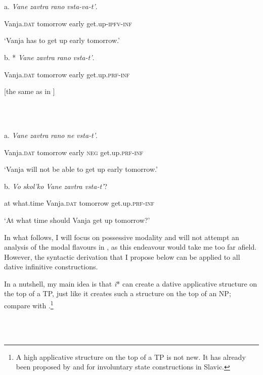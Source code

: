 \documentclass[output=paper,modfonts,nonflat]{langsci/langscibook}
\begin{document}
\ea%
    \label{ex:key:29}
    \gll\\
        \\
    \glt
    \z

          a.   \textit{Vane}\textbf{ }          \textit{zavtra}       \textit{rano}   \textit{vsta-va-t’}.

    Vanja.\textsc{dat}  tomorrow  early  get.up-\textsc{ipfv-inf}

  ‘Vanja has to get up early tomorrow.’  

  b.   *  \textit{Vane}\textbf{ }          \textit{zavtra}       \textit{rano}   \textit{vsta-t’}.

    Vanja.\textsc{dat}  tomorrow  early  get.up.\textsc{prf-inf}

  [the same as in ] 

\ea%
    \label{ex:key:30}
    \gll\\
        \\
    \glt
    \z

          a.  \textit{Vane}\textbf{ }          \textit{zavtra}       \textit{rano}   \textit{ne}     \textit{vsta-t’}.

    Vanja.\textsc{dat}  tomorrow  early  \textsc{neg}    get.up.\textsc{prf-inf}

  ‘Vanja will not be able to get up early tomorrow.’ 

  b.    \textit{Vo}    \textit{skol’ko}       \textit{Vane}           \textit{zavtra}         \textit{vsta-t’}?

    at    what.time    Vanja.\textsc{dat}  tomorrow    get.up.\textsc{prf-inf}

  ‘At what time should Vanja get up tomorrow?’ 

In what follows, I will focus on possessive modality and will not attempt an analysis of the modal flavours in , as this endeavour would take me too far afield. However, the syntactic derivation that I propose below can be applied to all dative infinitive constructions.  

In a nutshell, my main idea is that \textit{i}* can create a dative applicative structure on the top of a TP, just like it creates such a structure on the top of an NP; compare  with .\footnote{A high applicative structure on the top of a TP is not new. It has already been proposed by \citet{Rivero2009} and \citet{RiveroArregui2012} for involuntary state constructions in Slavic.}      

\ea%
    \label{ex:key:31}
    \gll\\
        \\
    \glt
    \z
\end{document}
